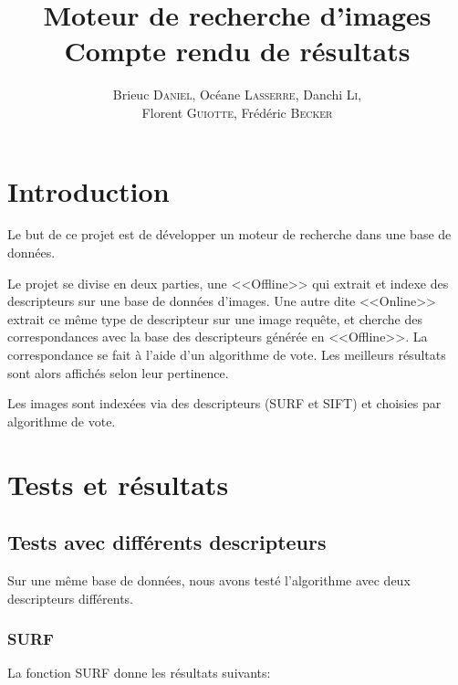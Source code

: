 \documentclass{article}
\author{Brieuc \textsc{Daniel}, Océane \textsc{Lasserre}, Danchi \textsc{Li}, \\ Florent \textsc{Guiotte}, Frédéric \textsc{Becker}}
\title{Moteur de recherche d'images \\ \Large{Compte rendu de résultats}}
\begin{document}
\maketitle
\tableofcontents

\section{Introduction}

Le but de ce projet est de développer un moteur de recherche dans une base de données. 

Le projet se divise en deux parties, une <<Offline>> qui extrait et indexe des descripteurs sur une base de données
d'images. Une autre dite <<Online>> extrait ce même type de descripteur sur une image requête, et cherche des
correspondances avec la base des descripteurs générée en <<Offline>>. La correspondance se fait à l'aide d'un 
algorithme de vote. Les meilleurs résultats sont alors affichés selon leur pertinence. 

Les images sont indexées via des descripteurs (SURF et SIFT) et choisies par algorithme de vote.

\section{Tests et résultats}
\subsection{Tests avec différents descripteurs}

Sur une même base de données, nous avons testé l'algorithme avec deux descripteurs différents.

\subsubsection{SURF}

La fonction SURF donne les résultats suivants:
\end{document}
